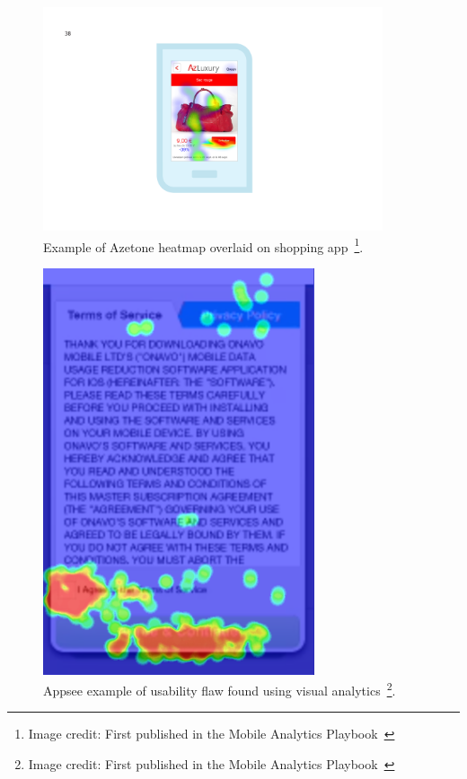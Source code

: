 \begin{figure}[htbp!]
    \begin{minipage}{\textwidth}
    \centering
    \includegraphics[width=10cm]{images/mobile-analytics-playbook/Chart-10-azetone.png}
    \caption[Example of Azetone heatmap overlaid on shopping app]{Example of Azetone heatmap overlaid on shopping app~\footnote{Image credit: First published in the Mobile Analytics Playbook~\cite{harty_aymer_playbook_2016}}.}
    \label{fig:azetone-heatmap-example}
    \end{minipage}
\end{figure}

\begin{figure}[htbp!]
    \begin{minipage}{\textwidth}
    \centering
    \includegraphics[width=8cm]{images/mobile-analytics-playbook/Appsee-Screen-Heatmap.png}
    \caption[Appsee example of usability flaw found using visual analytics]{Appsee example of usability flaw found using visual analytics~\footnote{Image credit: First published in the Mobile Analytics Playbook~\cite{harty_aymer_playbook_2016}}.}
    \label{fig:appsee-example-t-and-c-screen}
    \end{minipage}
\end{figure}

